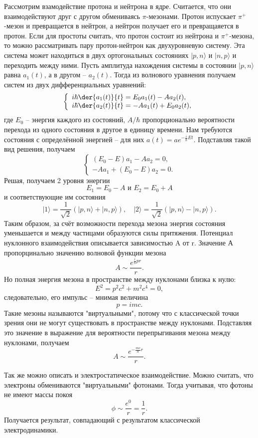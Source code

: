 \newcommand{\bra}[1]{\ensuremath{\langle#1|}}
\newcommand{\ket}[1]{\ensuremath{|#1\rangle}}
Рассмотрим взамодействие протона и нейтрона в ядре. Считается, что они
взаимодействуют друг с другом обмениваясь \( \pi \)-мезонами. Протон испускает
\( \pi^+ \)-мезон и превращается в нейтрон, а нейтрон получает его и
превращаяется в протон. Если для простоты считать, что протон состоит из
нейтрона и \( \pi^+ \)-мезона, то можно рассматривать пару протон-нейтрон как
двухуровневую систему.
Эта система может находиться в двух ортогональных состояниях
\ket{p,n}  и \ket{n,p} и переходить между ними. Пусть амплитуда нахождения
системы в состоянии \ket{p,n} равна \( a_1(t) \), а в другом -- \( a_2(t) \).
Тогда из волнового уравнения получаем систем из двух дифференциальных уравнений:
\[
    \left\{
        \begin{array}{l}
            i\hbar\der{a_1(t)}{t} = E_0 a_1(t) - A a_2(t),\\
            i\hbar\der{a_2(t)}{t} = - A a_1(t) + E_0 a_2(t),
        \end{array}
    \right.
\]
где \( E_0 \) -- энергия каждого из состояний, \( A / \hbar \) пропорционально
вероятности перехода из одного состояния в другое в единицу времени.
Нам требуются состояния с определённой энергией -- для них
\( a(t)  = ae^{-\frac{i}{\hbar}Et} \).
Подставляя такой вид решения, получаем
\[
    \left\{
        \begin{array}{l}
            (E_0-E) a_1 - A a_2 = 0,\\
            - A a_1 + (E_0-E) a_2 = 0.
        \end{array}
    \right.
\]
Решая, получаем 2 уровня энергии
\[
    E_1 = E_0 - A \text{ и } E_2 = E_0 + A
\]
и соответствующие им состояния
\[
    \ket{1} = \frac{1}{\sqrt{2}}(\ket{p,n} + \ket{n,p}),\quad
    \ket{2} = \frac{1}{\sqrt{2}}(\ket{p,n} - \ket{n,p}).
\]
Таким образом, за счёт возможности перехода мезона энергия состояния уменьшается
и между частицами образуются силы притяжения. Потенциал нуклонного
взаимодействия описывается зависимостью A от r. Значение А пропорцинально
значению волновой функции мезона
\[
    A \sim \frac{e^{\frac{i}{\hbar}pr}}{r}.
\]
Но полная энергия мезона в пространстве между нуклонами близка к нулю:
\[
    E^2 = p^2c^2 + m^2c^4 = 0,
\]
следовательно, его импульс -- мнимая величина
\[
    p = imc.
\]
Такие мезоны называются "виртуальными", потому что с классической точки зрения
они не могут существовать в пространстве между нуклонами.
Подставляя это значение в выражение для вероятности перепрыгивания мезона между
нуклонами, получаем
\[
    A \sim \frac{e^{-\frac{mc}{\hbar}r}}{r}.
\]

Так же можно описать и электростатическое взаимодействие. Можно считать, что
электроны обмениваются "виртуальными" фотонами. Тогда учитывая, что фотоны не
имеют массы покоя
\[
    \phi \sim \frac{e^{0}}{r} = \frac{1}{r}.
\]
Получается результат, совпадающий с результатом классической электродинамики.

